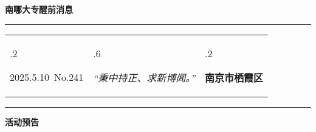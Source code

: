 \documentclass[letterpaper, 12pt]{article}
\begin{document}
\begin{center}
    \Huge\textbf{南哪大专醒前消息}
\end{center}
\vspace{4mm}
\hrule
\renewcommand\tabularxcolumn[1]{m{#1}}
\begin{tabularx}{\textwidth}{>{\hsize.2\hsize}X>{\hsize.6\hsize}X>{\hsize.2\hsize}X}
    \begin{flushleft}
        2025.5.10\, No.241
    \end{flushleft}
    &
    \begin{center}
        \textit{“秉中持正、求新博闻。”}
    \end{center}
    &
    \begin{flushright}
        \textbf{南京市栖霞区}
    \end{flushright}
\end{tabularx}
\vspace{-3.5mm}
\hrule
\vspace{4mm}
\centerline{\huge\textbf{活动预告}}
\end{document}
